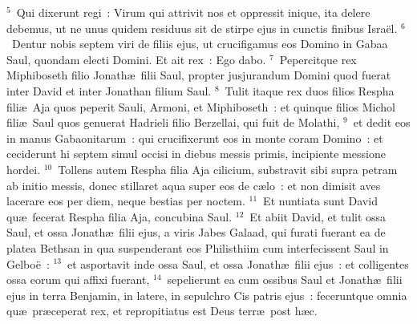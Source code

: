 ${}^{5}$~Qui dixerunt regi~: Virum qui attrivit nos et oppressit inique, ita delere debemus, ut ne unus quidem residuus sit de stirpe ejus in cunctis finibus Isra\"el.
${}^{6}$~Dentur nobis septem viri de filiis ejus, ut crucifigamus eos Domino in Gabaa Saul, quondam electi Domini. Et ait rex~: Ego dabo.
${}^{7}$~Pepercitque rex Miphiboseth filio Jonath\ae\ filii Saul, propter jusjurandum Domini quod fuerat inter David et inter Jonathan filium Saul.
${}^{8}$~Tulit itaque rex duos filios Respha fili\ae\ Aja quos peperit Sauli, Armoni, et Miphiboseth~: et quinque filios Michol fili\ae\ Saul quos genuerat Hadrieli filio Berzellai, qui fuit de Molathi,
${}^{9}$~et dedit eos in manus Gabaonitarum~: qui crucifixerunt eos in monte coram Domino~: et ceciderunt hi septem simul occisi in diebus messis primis, incipiente messione hordei.
${}^{10}$~Tollens autem Respha filia Aja cilicium, substravit sibi supra petram ab initio messis, donec stillaret aqua super eos de c\ae lo~: et non dimisit aves lacerare eos per diem, neque bestias per noctem.
${}^{11}$~Et nuntiata sunt David qu\ae\ fecerat Respha filia Aja, concubina Saul.
${}^{12}$~Et abiit David, et tulit ossa Saul, et ossa Jonath\ae\ filii ejus, a viris Jabes Galaad, qui furati fuerant ea de platea Bethsan in qua suspenderant eos Philisthiim cum interfecissent Saul in Gelbo\"e~:
${}^{13}$~et asportavit inde ossa Saul, et ossa Jonath\ae\ filii ejus~: et colligentes ossa eorum qui affixi fuerant,
${}^{14}$~sepelierunt ea cum ossibus Saul et Jonath\ae\ filii ejus in terra Benjamin, in latere, in sepulchro Cis patris ejus~: feceruntque omnia qu\ae\ pr\ae ceperat rex, et repropitiatus est Deus terr\ae\ post h\ae c.



